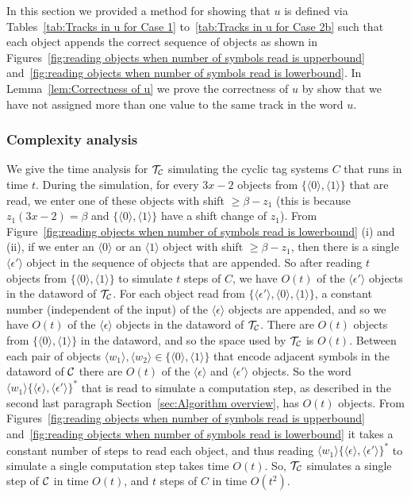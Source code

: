 \documentclass[11pt]{article} \usepackage{amsfonts,amsmath,amssymb,amsthm}
\newcommand{\tne}[1]{\ensuremath{\langle #1\rangle}}
\newcommand{\encodeOne}{\tne{1}}
\newcommand{\encodeZero}{\tne{0}}
\newcommand{\encodeDeletion}{\tne{\epsilon}}
\newcommand{\encodeDeletionPrime}{\tne{\epsilon'}}
\begin{document}
In this section we provided a method for showing that $u$ is defined via Tables~\ref{tab:Tracks in u for Case 1} to~\ref{tab:Tracks in u for Case 2b} such that each object appends the correct sequence of objects as shown in Figures~\ref{fig:reading objects when number of symbols read is upperbound} and~\ref{fig:reading objects when number of symbols read is lowerbound}. In Lemma~\ref{lem:Correctness of u} we prove the correctness of $u$ by show that we have not assigned more than one value to the same track in the word $u$.




\subsubsection{Complexity analysis}
We give the time analysis for $\mathcal{T_{\mathcal{C}}}$ simulating the cyclic tag systems $C$ that runs in time $t$. 
During the simulation, for every $3x-2$ objects from $\{\encodeZero,\encodeOne\}$ that are read, we enter one of these objects with shift $\geqslant\beta-z_1$ (this is because $z_1(3x-2)=\beta$ and $\{\encodeZero,\encodeOne\}$ have a shift change of $z_1$). 
From Figure~\ref{fig:reading objects when number of symbols read is lowerbound} (i) and (ii), if we enter an $\encodeZero$ or an $\encodeOne$ object with shift $\geqslant\beta-z_1$, then there is a single $\encodeDeletionPrime$ object in the sequence of objects that are appended. So after reading $t$ objects from $\{\encodeZero,\encodeOne\}$ to simulate $t$ steps of $C$, we have $O(t)$ of the $\encodeDeletionPrime$ objects in the dataword of $\mathcal{T_{\mathcal{C}}}$. 
For each object read from $\{\encodeDeletionPrime,\encodeZero,\encodeOne\}$, a constant number (independent of the input) of the $\encodeDeletion$ objects are appended, and so we have $O(t)$ of the $\encodeDeletion$ objects in the dataword of $\mathcal{T_{\mathcal{C}}}$. 
There are $O(t)$ objects from $\{\encodeZero,\encodeOne\}$ in the dataword, and so the space used by $\mathcal{T_{\mathcal{C}}}$ is $O(t)$. 
Between each pair of objects $\tne{w_1},\tne{w_2}\in\{\encodeZero,\encodeOne\}$ that encode adjacent symbols in the dataword of $\mathcal{C}$ there are $O(t)$ of the $\encodeDeletion$ and $\encodeDeletionPrime$ objects. 
So the word $\tne{w_1}\{\encodeDeletion,\encodeDeletionPrime\}^\ast$ that is read to simulate a computation step, as described in the second last paragraph Section~\ref{sec:Algorithm overview}, has $O(t)$ objects.
From Figures~\ref{fig:reading objects when number of symbols read is upperbound} and~\ref{fig:reading objects when number of symbols read is lowerbound} it takes a constant number of steps to read each object, and thus reading $\tne{w_1}\{\encodeDeletion,\encodeDeletionPrime\}^\ast$ to simulate a single computation step takes time $O(t)$.
So, $\mathcal{T_{\mathcal{C}}}$ simulates a single step of $\mathcal{C}$ in time $O(t)$, and $t$ steps of $C$ in time $O(t^2)$.
\end{document}
